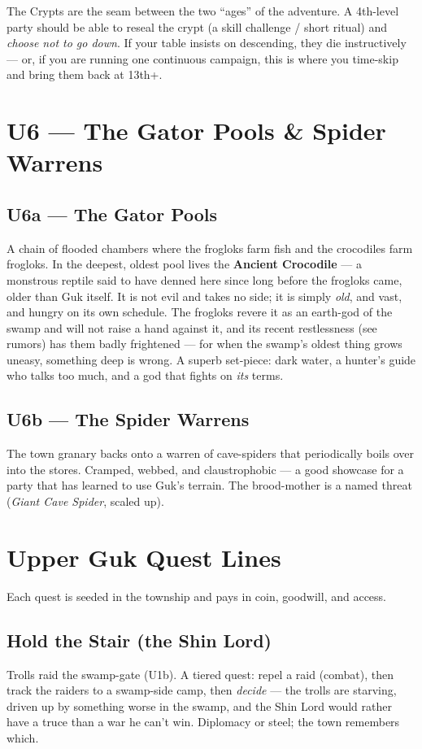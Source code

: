 \documentclass[10pt,twoside]{report}
\begin{document}
\begin{gmnote}
The Crypts are the seam between the two ``ages'' of the adventure. A 4th-level party should be able to reseal the crypt (a skill challenge / short ritual) and \emph{choose not to go down}. If your table insists on descending, they die instructively --- or, if you are running one continuous campaign, this is where you time-skip and bring them back at 13th+.
\end{gmnote}

\section{U6 --- The Gator Pools \& Spider Warrens}
\subsection*{U6a --- The Gator Pools}
A chain of flooded chambers where the frogloks farm fish and the crocodiles farm frogloks. In the deepest, oldest pool lives the \textbf{Ancient Crocodile} --- a monstrous reptile said to have denned here since long before the frogloks came, older than Guk itself. It is not evil and takes no side; it is simply \emph{old}, and vast, and hungry on its own schedule. The frogloks revere it as an earth-god of the swamp and will not raise a hand against it, and its recent restlessness (see rumors) has them badly frightened --- for when the swamp's oldest thing grows uneasy, something deep is wrong. A superb set-piece: dark water, a hunter's guide who talks too much, and a god that fights on \emph{its} terms.
\subsection*{U6b --- The Spider Warrens}
The town granary backs onto a warren of cave-spiders that periodically boils over into the stores. Cramped, webbed, and claustrophobic --- a good showcase for a party that has learned to use Guk's terrain. The brood-mother is a named threat (\emph{Giant Cave Spider}, scaled up).

\section{Upper Guk Quest Lines}
Each quest is seeded in the township and pays in coin, goodwill, and access.

\subsection*{Hold the Stair (the Shin Lord)}
Trolls raid the swamp-gate (U1b). A tiered quest: repel a raid (combat), then track the raiders to a swamp-side camp, then \emph{decide} --- the trolls are starving, driven up by something worse in the swamp, and the Shin Lord would rather have a truce than a war he can't win. Diplomacy or steel; the town remembers which.
\end{document}
